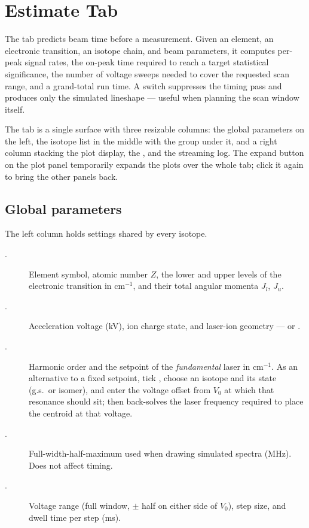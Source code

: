 \section{Estimate Tab}
\label{sec:estimate}

The  tab predicts beam time before a measurement. Given
an element, an electronic transition, an isotope chain, and beam
parameters, it computes per-peak signal rates, the on-peak time
required to reach a target statistical significance, the number of
voltage sweeps needed to cover the requested scan range, and a
grand-total run time. A  switch suppresses the
timing pass and produces only the simulated lineshape --- useful when
planning the scan window itself.

The tab is a single surface with three resizable columns: the global
parameters on the left, the isotope list in the middle with the
 group under it, and a right column stacking the plot
display, the , and the streaming log. The
expand button on the plot panel temporarily expands the plots over the
whole tab; click it again to bring the other panels back.

\subsection{Global parameters}

The left column holds settings shared by every isotope.

\begin{description}
    \item[.]
        Element symbol, atomic number $Z$, the lower and upper levels
        of the electronic transition in cm$^{-1}$, and their total
        angular momenta $J_l$, $J_u$.
    \item[.]
        Acceleration voltage (kV), ion charge state, and laser-ion
        geometry ---  or .
    \item[.]
        Harmonic order and the setpoint of the \emph{fundamental}
        laser in cm$^{-1}$. As an alternative to a fixed setpoint,
        tick , choose an isotope and its state
        (g.s.\ or isomer), and enter the voltage offset  from
        $V_0$ at which that resonance should sit; \denis{} then
        back-solves the laser frequency required to place the
        centroid at that voltage.
    \item[.]
        Full-width-half-maximum used when drawing simulated spectra
        (MHz). Does not affect timing.
    \item[.]
        Voltage range (full window, $\pm$ half on either side of
        $V_0$), step size, and dwell time per step (ms).
\end{description}

